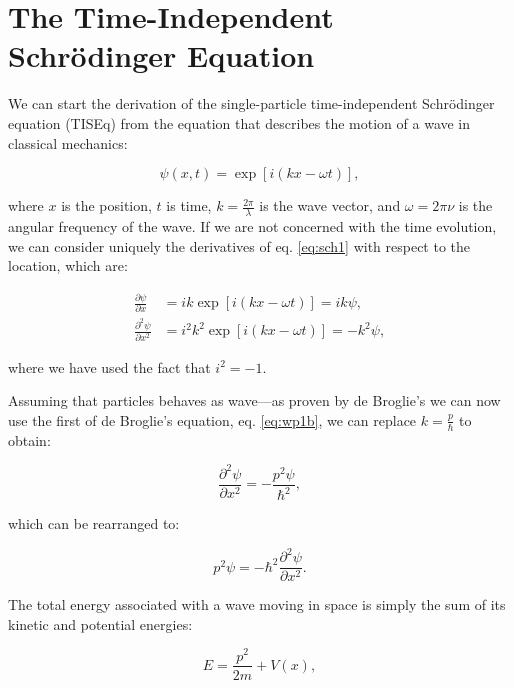 \documentclass[
  9pt,
]{extbook}
\theoremstyle{definition}
\theoremstyle{definition}
\theoremstyle{definition}
\theoremstyle{remark}
\begin{document}
\hypertarget{the-time-independent-schruxf6dinger-equation}{%
\section{The Time-Independent Schrödinger Equation}\label{the-time-independent-schruxf6dinger-equation}}

We can start the derivation of the single-particle time-independent Schrödinger equation (TISEq) from the equation that describes the motion of a wave in classical mechanics:

\begin{equation}
\psi(x,t)=\exp[i(kx-\omega t)],
\label{eq:sch1}
\end{equation}

where \(x\) is the position, \(t\) is time, \(k=\frac{2\pi}{\lambda}\) is the wave vector, and \(\omega=2\pi\nu\) is the angular frequency of the wave. If we are not concerned with the time evolution, we can consider uniquely the derivatives of eq. \eqref{eq:sch1} with respect to the location, which are:

\begin{equation}
\begin{aligned}
\frac{\partial \psi}{\partial x} &=ik\exp[i(kx-\omega t)] = ik\psi, \\
\frac{\partial^2 \psi}{\partial x^2} &=i^2k^2\exp[i(kx-\omega t)] = -k^2\psi,
\end{aligned}
\label{eq:sch2}
\end{equation}

where we have used the fact that \(i^2=-1\).

Assuming that particles behaves as wave---as proven by de Broglie's we can now use the first of de Broglie's equation, eq. \eqref{eq:wp1b}, we can replace \(k=\frac{p}{\hbar}\) to obtain:

\begin{equation}
\frac{\partial^2 \psi}{\partial x^2} = -\frac{p^2\psi}{\hbar^2},
\label{eq:sch3}
\end{equation}

which can be rearranged to:

\begin{equation}
p^2 \psi = -\hbar^2 \frac{\partial^2 \psi}{\partial x^2}.
\label{eq:sch4}
\end{equation}

The total energy associated with a wave moving in space is simply the sum of its kinetic and potential energies:

\begin{equation}
E = \frac {p^{2}}{2m} + V(x),
\label{eq:sch5}
\end{equation}
\end{document}
